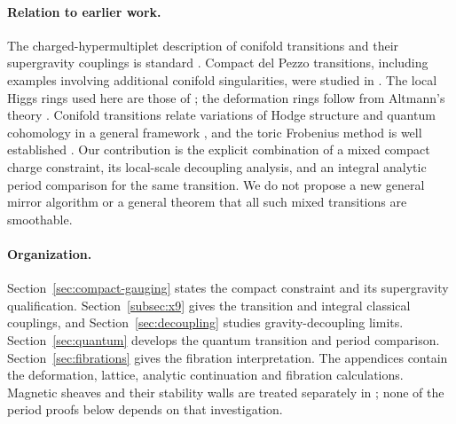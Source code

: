 \paragraph{Relation to earlier work.}
The charged-hypermultiplet description of conifold transitions
and their supergravity couplings is standard
\cite{Greene:1995hu,Mohaupt:2004de}. Compact del Pezzo
transitions, including examples involving additional conifold
singularities, were studied in \cite{Malyshev:2007zz}.
The local Higgs rings used here are those of
\cite{Cremonesi:2015lsa}; the deformation rings follow from
Altmann's theory \cite{Altmann:1997}.
Conifold transitions relate variations of Hodge structure and
quantum cohomology in a general framework
\cite{Lee:2018Conifold}, and the toric Frobenius method is
well established \cite{Hosono:1995Mirror,Demirtas:2024Mirror}.
Our contribution is the explicit combination of a mixed
compact charge constraint, its local-scale decoupling
analysis, and an integral analytic period comparison for the
same transition. We do not propose a new general mirror
algorithm or a general theorem that all such mixed
transitions are smoothable.

\paragraph{Organization.}
Section~\ref{sec:compact-gauging} states the compact constraint
and its supergravity qualification.
Section~\ref{subsec:x9} gives the transition and integral
classical couplings, and Section~\ref{sec:decoupling} studies
gravity-decoupling limits. Section~\ref{sec:quantum} develops
the quantum transition and period comparison.
Section~\ref{sec:fibrations} gives the fibration interpretation.
The appendices contain the deformation, lattice, analytic
continuation and fibration calculations. Magnetic sheaves and
their stability walls are treated separately in
\cite{Wuebben:2026magnetic}; none of the period proofs below
depends on that investigation.
